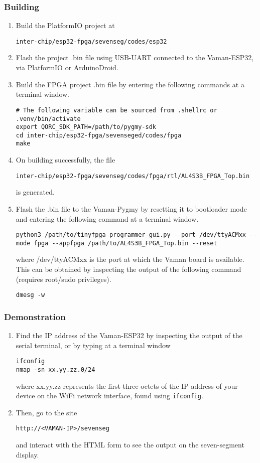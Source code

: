 \subsubsection{Building}
\begin{enumerate}
    \item Build the PlatformIO project at
    \begin{lstlisting}
inter-chip/esp32-fpga/sevenseg/codes/esp32
    \end{lstlisting}
    \item Flash the project .bin file using USB-UART connected to the 
    Vaman-ESP32, via PlatformIO or ArduinoDroid.
    \item Build the FPGA project .bin file by entering the following commands at
    a terminal window.
    \begin{lstlisting}
# The following variable can be sourced from .shellrc or .venv/bin/activate
export QORC_SDK_PATH=/path/to/pygmy-sdk
cd inter-chip/esp32-fpga/sevenseged/codes/fpga
make
    \end{lstlisting}
    \item On building successfully, the file
    \begin{lstlisting}
inter-chip/esp32-fpga/sevenseg/codes/fpga/rtl/AL4S3B_FPGA_Top.bin
    \end{lstlisting}
    is generated.
    \item Flash the .bin file to the Vaman-Pygmy by resetting it to bootloader
    mode and entering the following command at a terminal window.
    \begin{lstlisting}
python3 /path/to/tinyfpga-programmer-gui.py --port /dev/ttyACMxx --mode fpga --appfpga /path/to/AL4S3B_FPGA_Top.bin --reset
    \end{lstlisting}
    where /dev/ttyACMxx is the port at which the Vaman board is available. This
    can be obtained by inspecting the output of the following command (requires
    root/sudo privileges).
    \begin{lstlisting}
dmesg -w
    \end{lstlisting}
\end{enumerate}

\subsubsection{Demonstration}
\begin{enumerate}
    \item Find the IP address of the Vaman-ESP32 by inspecting the output of the
    serial terminal, or by typing at a terminal window
    \begin{lstlisting}
ifconfig
nmap -sn xx.yy.zz.0/24
    \end{lstlisting}
    where xx.yy.zz represents the first three octets of the IP address of your
    device on the WiFi network interface, found using \texttt{ifconfig}.
    \item Then, go to the site
    \begin{lstlisting}
http://<VAMAN-IP>/sevenseg
    \end{lstlisting}
    and interact with the HTML form to see the output on the seven-segment
    display.
\end{enumerate}

